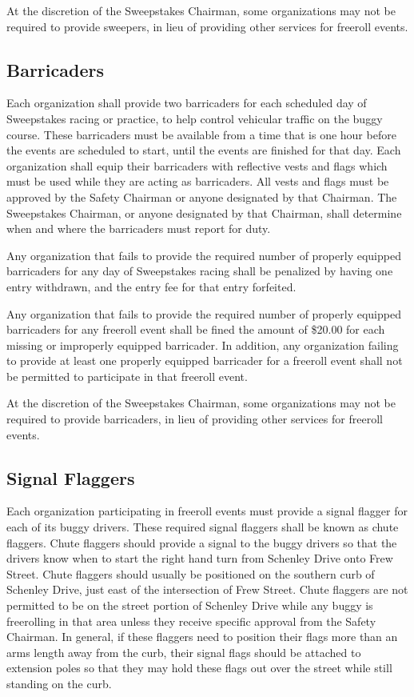 	At the discretion of the Sweepstakes Chairman, some organizations may not be
	required to provide sweepers, in lieu of providing other services for freeroll
	events.
	
\subsection{Barricaders}
\label{subsec:Barricaders}

	Each organization shall provide two barricaders for each scheduled day of
	Sweepstakes racing or practice, to help control vehicular traffic on the buggy course.
	These barricaders must be available from a time that is one hour before the events
	are scheduled to start, until the events are finished for that day. Each
	organization shall equip their barricaders with reflective vests and flags which
	must be used while they are acting as barricaders. All vests and flags must be
	approved by the Safety Chairman or anyone designated by that Chairman. The
	Sweepstakes Chairman, or anyone designated by that Chairman, shall determine
	when and where the barricaders must report for duty.

	Any organization that fails to provide the required number of properly equipped
	barricaders for any day of Sweepstakes racing shall be penalized by having one
	entry withdrawn, and the entry fee for that entry forfeited.

	Any organization that fails to provide the required number of properly equipped
	barricaders for any freeroll event shall be fined the amount of \$20.00 for
	each missing or improperly equipped barricader. In addition, any organization
	failing to provide at least one properly equipped barricader for a freeroll
	event shall not be permitted to participate in that freeroll event.

	At the discretion of the Sweepstakes Chairman, some organizations may not be
	required to provide barricaders, in lieu of providing other services for freeroll
	events.
	
	
\subsection{Signal Flaggers}
\label{subsec:Flaggers}

	Each organization participating in freeroll events must provide a signal
	flagger for each of its buggy drivers. These required signal flaggers shall be
	known as chute flaggers. Chute flaggers should provide a signal to the buggy
	drivers so that the drivers know when to start the right hand turn from
	Schenley Drive onto Frew Street. Chute flaggers should usually be positioned on
	the southern curb of Schenley Drive, just east of the intersection of Frew
	Street. Chute flaggers are not permitted to be on the street portion of
	Schenley Drive while any buggy is freerolling in that area unless they receive
	specific approval from the Safety Chairman. In general, if these flaggers need
	to position their flags more than an arms length away from the curb, their
	signal flags should be attached to extension poles so that they may hold these
	flags out over the street while still standing on the curb.

